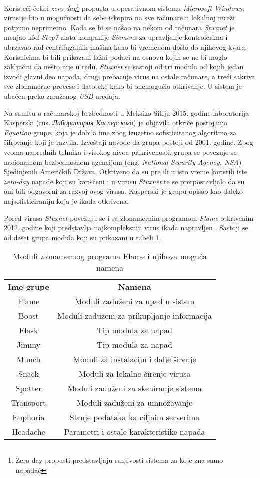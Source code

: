 \documentclass[a4paper]{article}
\begin{document}
Koristeći četiri \textit{zero-day}\footnote{Zero-day propusti predstavljaju ranjivosti sistema za koje zna samo napadač} propusta u operativnom sistemu \textit{Microsoft Windows}, virus je bio u mogućnosti da sebe iskopira na sve računare u lokalnoj mreži potpuno neprimetno. Kada se bi se našao na nekom od računara \textit{Stuxnet} je menjao kôd \textit{Step7} alata kompanije \textit{Siemens} za upravljanje kontrolerima i ubrzavao rad centrifugalnih mašina kako bi vremenom došlo do njihovog kvara. Korisnicima bi bili prikazani lažni podaci na osnovu kojih se ne bi moglo zaključiti da nešto nije u redu. \textit{Stuxnet} se sastoji od tri modula od kojih jedan izvodi glavni deo napada, drugi prebacuje virus na ostale računare, a treći sakriva sve zlonamerne procese i datoteke kako bi onemogućio otkrivanje. U sistem je ubačen preko zaraženog \textit{USB} uređaja.

Na samitu o računarskoj bezbednosti u Meksiko Sitiju 2015. godine laboratorija Kasperski (rus. \textit{Лаборатория Касперского}) je objavila otkriće postojanja \textit{Equation} grupe, koja je dobila ime zbog izuzetno sofisticiranog algoritma za šifrovanje koji je razvila. Izveštaji navode da grupa postoji od 2001. godine. Zbog veoma naprednih tehnika i visokog nivoa prikrivenosti, grupa se povezuje sa nacionalnom bezbednosnom agencijom (eng. \textit{National Security Agency, NSA}) Sjedinjenih Američkih Država. Otkriveno da su pre ili u isto vreme koristili iste \textit{zero-day} napade koji su korišćeni i u virusu \textit{Stuxnet} te se pretpostavljalo da su oni bili odgovorni za razvoj ovog virusa. Kasperski je grupu opisao kao daleko najsofisticiraniju koja je ikada otkrivena.

Pored virusa \textit{Stuxnet} povezuju se i sa zlonamernim programom \textit{Flame} otkrivenim 2012. godine koji predstavlja najkompleksniji virus ikada napravljen \cite{flame}. Sastoji se od deset grupa modula koji su prikazani u tabeli \ref{table:1}.

\begin{table}[h!]
\centering
\begin{tabular}{||c  c||} 
 \hline
 \textbf{Ime grupe} & \textbf{Namena} \\ 
 Flame & Moduli zaduženi za upad u sistem \\ 
 Boost & Moduli zaduženi za prikupljanje informacija \\
 Flask & Tip modula za napad \\
 Jimmy & Tip modula za napad \\
 Munch & Moduli za instalaciju i dalje širenje \\
 Snack & Moduli za lokalno širenje virusa \\
 Spotter & Moduli zaduženi za skeniranje sistema \\
 Transport & Moduli zaduženi za umnožavanje \\
 Euphoria & Slanje podataka ka ciljnim serverima \\
 Headache & Parametri i ostale karakteristike napada \\ [1ex] 
 \hline
\end{tabular}
\caption{Moduli zlonamernog programa Flame i njihova moguća namena}
\label{table:1}
\end{table}
\end{document}

